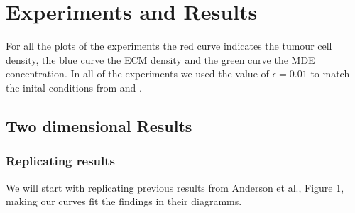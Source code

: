 

\section{Experiments and Results}
For all the plots of the experiments the red curve indicates the tumour cell density, the blue curve the ECM density and the green curve the MDE concentration. In all of the experiments we used the value of $\epsilon = 0.01$ to match the inital conditions from \cite{anderson_mathematical_2000} and \cite{Kolev2010}.
\subsection{Two dimensional Results}
\subsubsection{Replicating results}
We will start with replicating previous results from Anderson et al.\cite{anderson_mathematical_2000}, Figure 1, making our curves fit the findings in their diagramms. 


